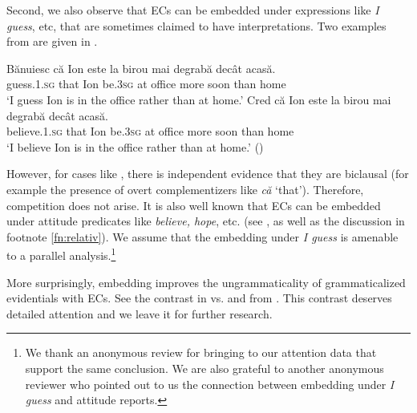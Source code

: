 \documentclass[output=paper,colorlinks,citecolor=brown,newtxmath]{langsci/langscibook}
\begin{document}
Second, we also observe that ECs can be embedded under expressions like \textit{I guess}, etc, that are sometimes claimed to have  interpretations. Two examples from  are given in .


	\ea \label{taglexevid} \ea \gll Bănuiesc că Ion este la birou mai degrabă decât acasă.\\
		guess.\textsc{1.sg} that Ion be.\textsc{3sg} at office more soon than home\\
		\glt `I guess Ion is in the office rather than at home.'
		\ex \gll Cred că Ion este la birou mai degrabă decât acasă.\\
		believe.\textsc{1.sg} that Ion be.\textsc{3sg} at office more soon than home\\
		\glt `I believe Ion is in the office rather than at home.' \hfill ()
		\z \z

However, for cases like , there is independent evidence that they are biclausal (for example the presence of overt complementizers like \textit{că} `that'). Therefore, competition does not arise. It is also well known that ECs can be embedded under attitude predicates like \textit{believe, hope}, etc. (see \citealt{herrub14}, as well as the discussion in footnote \ref{fn:relativ}). We assume that the embedding under \textit{I guess} is amenable to a parallel analysis.\footnote{We thank an anonymous review for bringing to our attention  data that support the same conclusion. We are also grateful to another anonymous reviewer who pointed out to us the connection between embedding under \textit{I guess} and attitude reports.
}

More surprisingly, embedding improves the ungrammaticality of grammaticalized evidentials with ECs. See the contrast in  vs.  and  from . This contrast deserves detailed attention and we leave it for further research.

	\ea \label{moremb}  \label{moremba}
		 \label{morembb}
        \z \z
\end{document}
